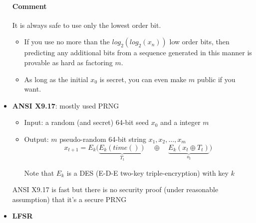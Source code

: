 \begin{itemize}
        \paragraph{Comment}
        It is always safe to use only the lowest order bit. 
        \begin{itemize}
            \item If you use no more than the $log_2 (log_2 (x_n ))$ low order bits, then predicting
                any additional bits from a sequence generated in this manner is
                provable as hard as factoring $m$. 
            \item As long as the initial $x_0$ is secret,
                you can even make $m$ public if you want.
        \end{itemize}

    \item \textbf{ANSI X9.17}: mostly used PRNG 

        \begin{itemize}
            \item Input: a random (and secret) 64-bit seed $x_0$ and a integer $m$
            \item Output: $m$ pseudo-random 64-bit string $x_1,x_2,\ldots,x_m$
                $$x_{t+1} = E_k\bigg(\underbrace{E_k(time())}_{T_t}
                \quad \oplus \quad \underbrace{E_k(x_t \oplus
                T_t)}_{o_t}\bigg)$$
            \item[Note] that $E_k$ is a DES (E-D-E two-key
                triple-encryption) with key $k$
        \end{itemize}

        ANSI X9.17 is fast but there is no security proof (under
        reasonable assumption) that it's a secure PRNG

    \item \textbf{LFSR}
        \begin{center}
        \end{center}

\end{itemize}


